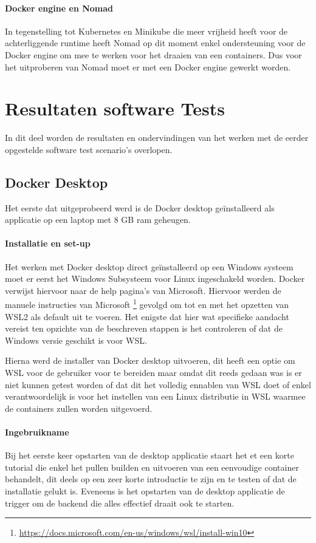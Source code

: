 \paragraph{Docker engine en Nomad}
In tegenstelling tot Kubernetes en Minikube die meer vrijheid heeft voor de achterliggende runtime heeft Nomad op dit moment enkel ondersteuning voor de Docker engine om mee te werken voor het draaien van een containers. Dus voor het uitproberen van Nomad moet er met een Docker engine gewerkt worden.

\section{Resultaten software Tests}
In dit deel worden de resultaten en ondervindingen van het werken met de eerder opgestelde software test scenario’s overlopen. 

\subsection{Docker Desktop}
Het eerste dat uitgeprobeerd werd is de Docker desktop geïnstalleerd als applicatie op een laptop met 8 GB ram geheugen.

\paragraph{Installatie en set-up}
Het werken met Docker desktop direct geïnstalleerd op een Windows systeem moet er eerst het Windows Subsysteem voor Linux ingeschakeld worden. Docker verwijst hiervoor naar de help pagina’s van Microsoft. Hiervoor werden de manuele instructies van Microsoft \footnote{\url{https://docs.microsoft.com/en-us/windows/wsl/install-win10}} gevolgd om tot en met het opzetten van WSL2 als default uit te voeren. Het enigste dat hier wat specifieke aandacht vereist ten opzichte van de beschreven stappen is het controleren of dat de Windows versie geschikt is voor WSL.

Hierna werd de installer van Docker desktop uitvoeren, dit heeft een optie om WSL voor de gebruiker voor te bereiden maar omdat dit reeds gedaan was is er niet kunnen getest worden of dat dit het volledig ennablen van WSL doet of enkel verantwoordelijk is voor het instellen van een Linux distributie in WSL waarmee de containers zullen worden uitgevoerd.

\paragraph{Ingebruikname}
Bij het eerste keer opstarten van de desktop applicatie staart het et een korte tutorial die enkel het pullen builden en uitvoeren van een eenvoudige container behandelt,  dit deels op een zeer korte introductie te zijn en te testen of dat de installatie gelukt is. Eveneens is het opstarten van de desktop applicatie de trigger om de backend die alles effectief draait ook te starten.

